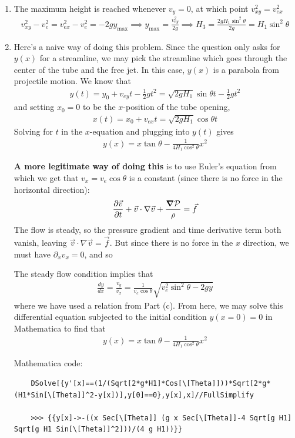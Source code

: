 \documentclass{article}
\theoremstyle{definition}
\newcommand{\p}{\partial}
\newcommand{\f}[2]{\frac{#1}{#2}}
\begin{document}
\begin{enumerate}[label=(\alph*)]
	\item The maximum height is reached whenever $v_y = 0$, at which point $v_{xy}^2 = v_{ex}^2$ 
	\begin{align*}
	v_{xy}^2 - v_e^2 =  v_{ex}^2 - v_e^2= -2gy_\text{max} \implies y_\text{max} = {\f{v_{ey}^2}{2g}} \implies \boxed{H_3 = \f{2gH_1 \sin^2\theta}{2g} = H_1 \sin^2\theta}
	\end{align*}
	
	\item Here's a naive way of doing this problem. Since the question only asks for $y(x)$ for a streamline, we may pick the streamline which goes through the center of the tube and the free jet. In this case, $y(x)$ is a parabola from projectile motion. We know that
	\begin{align*}
	y(t) = y_0 + v_{ey} t - \f{1}{2}gt^2 = \sqrt{2g H_1} \sin\theta t - \f{1}{2} gt^2
	\end{align*}
	and setting $x_0 = 0$ to be the $x$-position of the tube opening, 
	\begin{align*}
	x(t) = x_0 + v_{ex} t  = \sqrt{2g H_1}\cos\theta t 
	\end{align*}
	Solving for $t$ in the $x$-equation and plugging into $y(t)$ gives
	\begin{align*}
	\boxed{y(x) = x\tan\theta - \f{1}{4 H_1  \cos^2\theta} x^2}
	\end{align*}
	
	\textbf{A more legitimate way of doing this} is to use Euler's equation from which we get that $v_x = v_e\cos \theta$ is a constant (since there is no force in the horizontal direction): 
	\begin{align*}
	\f{\p \vec{v}}{\p t} + \vec{v}\cdot \nabla \vec{v} + \f{\grad \mathcal{P}}{\rho} = \vec{f}
	\end{align*}
	The flow is steady, so the pressure gradient and time derivative term both vanish, leaving $\vec{v}\cdot \nabla \vec{v} = \vec{f}$. But since there is no force in the $x$ direction, we must have $\p_x v_x = 0$, and so 
	
	The steady flow condition implies that 
	\begin{align*}
	\f{dy}{dx} = \f{v_y}{v_x} = \f{1}{v_e\cos\theta}\sqrt{v_e^2 \sin^2\theta - 2gy} 
	\end{align*}
	where we have used a relation from Part (c). From here, we may solve this differential equation subjected to the initial condition $y(x=0) = 0$ in Mathematica to find that
	\begin{align*}
	\boxed{y(x) = x\tan\theta - \f{1}{4 H_1  \cos^2\theta} x^2}
	\end{align*}
	
	Mathematica code:
	\begin{lstlisting}
	DSolve[{y'[x]==(1/(Sqrt[2*g*H1]*Cos[\[Theta]]))*Sqrt[2*g*(H1*Sin[\[Theta]]^2-y[x])],y[0]==0},y[x],x]//FullSimplify
	
	>>> {{y[x]->-((x Sec[\[Theta]] (g x Sec[\[Theta]]-4 Sqrt[g H1] Sqrt[g H1 Sin[\[Theta]]^2]))/(4 g H1))}}
	\end{lstlisting}
\end{enumerate}
\end{document}
